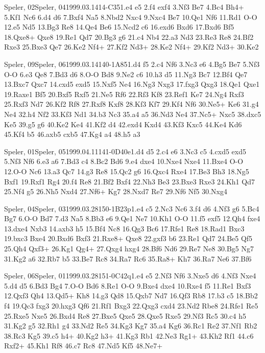 \documentclass[twocolumn,a4paper,10pt]{report}
\begin{document}
\begin{chessgame}{Speler, 02}{Speler, 04}{1999.03.14}{14}{\textonehalf-\textonehalf}{C35}{1.e4 e5 2.f4 exf4 3.Nf3 Be7 4.Bc4 Bh4+ 5.Kf1 Nc6 6.d4 d6 7.Bxf4 Na5 8.Nbd2 Nxc4 9.Nxc4 Be7 10.Qe1 Nf6 11.Rd1 O-O 12.e5 Nd5 13.Bg3 Re8 14.Qe4 Be6 15.Ncd2 c6 16.exd6 Bxd6 17.Bxd6 Bf5 18.Qxe8+ Qxe8 19.Re1 Qd7 20.Bg3 g6 21.c4 Nb4 22.a3 Nd3 23.Re3 Re8 24.Bf2 Rxe3 25.Bxe3 Qe7 26.Ke2 Nf4+ 27.Kf2 Nd3+ 28.Ke2 Nf4+ 29.Kf2 Nd3+ 30.Ke2}\end{chessgame}
\begin{chessgame}{Speler, 09}{Speler, 06}{1999.03.14}{14}{0-1}{A85}{1.d4 f5 2.c4 Nf6 3.Nc3 e6 4.Bg5 Be7 5.Nf3 O-O 6.e3 Qe8 7.Bd3 d6 8.O-O Bd8 9.Ne2 c6 10.h3 d5 11.Ng3 Bc7 12.Bf4 Qe7 13.Bxc7 Qxc7 14.cxd5 exd5 15.Nxf5 Ne4 16.Ng3 Nxg3 17.fxg3 Qxg3 18.Qe1 Qxe1 19.Raxe1 Bf5 20.Bxf5 Rxf5 21.Ne5 Rf6 22.Rf3 Kf8 23.Ref1 Ke7 24.Ng4 Rxf3 25.Rxf3 Nd7 26.Kf2 Rf8 27.Rxf8 Kxf8 28.Kf3 Kf7 29.Kf4 Nf6 30.Ne5+ Ke6 31.g4 Ne4 32.h4 Nf2 33.Kf3 Nd1 34.b3 Nc3 35.a4 a5 36.Nd3 Ne4 37.Nc5+ Nxc5 38.dxc5 Ke5 39.g5 g6 40.Ke2 Ke4 41.Kf2 d4 42.exd4 Kxd4 43.Kf3 Kxc5 44.Ke4 Kd6 45.Kf4 b5 46.axb5 cxb5 47.Kg4 a4 48.h5 a3}\end{chessgame}
\begin{chessgame}{Speler, 01}{Speler, 05}{1999.04.11}{14}{1-0}{D40e}{1.d4 d5 2.c4 e6 3.Nc3 c5 4.cxd5 exd5 5.Nf3 Nf6 6.e3 a6 7.Bd3 c4 8.Bc2 Bd6 9.e4 dxe4 10.Nxe4 Nxe4 11.Bxe4 O-O 12.O-O Nc6 13.a3 Qc7 14.g3 Re8 15.Qc2 g6 16.Qxc4 Rxe4 17.Be3 Bh3 18.Ng5 Bxf1 19.Rxf1 Rg4 20.f4 Re8 21.Bf2 Bxf4 22.Nh3 Be3 23.Bxe3 Rxe3 24.Kh1 Qd7 25.Nf4 g5 26.Nh5 Nxd4 27.Nf6+ Kg7 28.Nxd7 Re7 29.Nf6 Nf5 30.Nxg4}\end{chessgame}
\begin{chessgame}{Speler, 04}{Speler, 03}{1999.03.28}{15}{0-1}{B23p}{1.e4 c5 2.Nc3 Nc6 3.f4 d6 4.Nf3 g6 5.Bc4 Bg7 6.O-O Bd7 7.d3 Na5 8.Bb3 e6 9.Qe1 Ne7 10.Kh1 O-O 11.f5 exf5 12.Qh4 fxe4 13.dxe4 Nxb3 14.axb3 h5 15.Bf4 Nc8 16.Qg3 Bc6 17.Rfe1 Re8 18.Rad1 Bxc3 19.bxc3 Bxe4 20.Bxd6 Bxf3 21.Rxe8+ Qxe8 22.gxf3 b6 23.Re1 Qd7 24.Be5 Qf5 25.Qh4 Qxf3+ 26.Kg1 Qg4+ 27.Qxg4 hxg4 28.Bf6 Nd6 29.Re7 Ne8 30.Bg5 Ng7 31.Kg2 a6 32.Rb7 b5 33.Be7 Rc8 34.Ra7 Rc6 35.Ra8+ Kh7 36.Ra7 Ne6 37.Bf6}\end{chessgame}
\begin{chessgame}{Speler, 06}{Speler, 01}{1999.03.28}{15}{1-0}{C42q}{1.e4 e5 2.Nf3 Nf6 3.Nxe5 d6 4.Nf3 Nxe4 5.d4 d5 6.Bd3 Bg4 7.O-O Bd6 8.Re1 O-O 9.Bxe4 dxe4 10.Rxe4 f5 11.Re1 Bxf3 12.Qxf3 Qh4 13.Qd5+ Kh8 14.g3 Qd8 15.Qxb7 Nd7 16.Qf3 Rb8 17.b3 c5 18.Bb2 f4 19.Qc3 fxg3 20.hxg3 Qf6 21.Rf1 Bxg3 22.Qxg3 cxd4 23.Nd2 Rbe8 24.Rfe1 Re5 25.Rxe5 Nxe5 26.Bxd4 Re8 27.Bxe5 Qxe5 28.Qxe5 Rxe5 29.Nf3 Rc5 30.c4 h5 31.Kg2 g5 32.Rh1 g4 33.Nd2 Re5 34.Kg3 Kg7 35.a4 Kg6 36.Rc1 Re2 37.Nf1 Rb2 38.Rc3 Kg5 39.c5 h4+ 40.Kg2 h3+ 41.Kg3 Rb1 42.Ne3 Rg1+ 43.Kh2 Rf1 44.c6 Rxf2+ 45.Kh1 Rf8 46.c7 Rc8 47.Nd5 Kf5 48.Ne7+}\end{chessgame}
\end{document}
